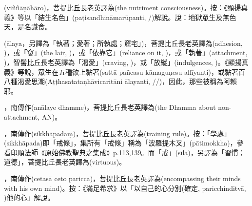 \startitemgroup[noteitems]
\item{}(viññāṇāhāro)，菩提比丘長老英譯為(the nutriment consciousness)。按：《顯揚真義》等以「結生名色」(paṭisandhināmarūpanti, /)解說。說：地獄眾生及無色天，是名識食。
\stopitemgroup

\startitemgroup[noteitems]
\item{}(ālaya，另譯為「執著；愛著；所執處；窟宅」)，菩提比丘長老英譯為(adhesion, )，或「窩」(the lair, )，或「依靠它」(reliance on it, )，或「執著」(attachment, )，智髻比丘長老英譯為「渴愛」(craving, )，或「放縱」(indulgences, )。《顯揚真義》等說，眾生在五種欲上黏著(sattā pañcasu kāmaguṇesu allīyanti)，或黏著百八種渴愛思潮(Aṭṭhasatataṇhāvicaritāni ālayanti, //)，因此，那些被稱為阿賴耶。
\item{}，南傳作(anālaye dhamme)，菩提比丘長老英譯為(the Dhamma about non-attachment, AN)。
\stopitemgroup

\startitemgroup[noteitems]
\item{}，南傳作(sikkhāpadaṃ)，菩提比丘長老英譯為(training rule)。按：「學處」(sikkhāpada)即「戒條」，集所有「戒條」稱為「波羅提木叉」(pātimokkha)，參看印順法師《原始佛教聖典之集成》p.113,139。而「戒」(sīla)，另譯為「習慣；道德」，菩提比丘長老英譯為(virtuous)。
\stopitemgroup

\startitemgroup[noteitems]
\item{}，南傳作(cetasā ceto paricca)，菩提比丘長老英譯為(encompassing their minds with his own mind)。按：《滿足希求》以「以自己的心分別(確定, paricchinditvā, )他的心」解說。
\stopitemgroup


